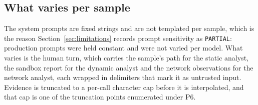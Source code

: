 \subsection{What varies per sample}\label{prompt-interpolation}

The system prompts are fixed strings and are not templated per sample, which is the reason
Section~\ref{sec:limitations} records prompt sensitivity as \texttt{PARTIAL}: production prompts
were held constant and were not varied per model. What varies is the human turn, which carries
the sample's path for the static analyst, the sandbox report for the dynamic analyst and the
network observations for the network analyst, each wrapped in delimiters that mark it as
untrusted input. Evidence is truncated to a per-call character cap before it is interpolated,
and that cap is one of the truncation points enumerated under P6.
